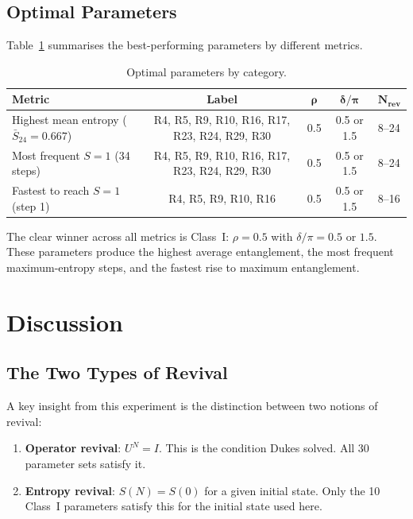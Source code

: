 \documentclass[12pt,a4paper]{article}
\begin{document}
\subsection{Optimal Parameters}

Table~\ref{tab:optimal} summarises the best-performing parameters by different metrics.

\begin{table}[H]
\centering
\caption{Optimal parameters by category.}
\label{tab:optimal}
\begin{tabular}{lcccl}
\toprule
\textbf{Metric} & \textbf{Label} & $\boldsymbol{\rho}$ & $\boldsymbol{\delta/\pi}$ & $\boldsymbol{N_{\text{rev}}}$ \\
\midrule
Highest mean entropy ($\bar{S}_{24} = 0.667$) & R4, R5, R9, R10, R16, R17, R23, R24, R29, R30 & 0.5 & 0.5 or 1.5 & 8--24 \\
Most frequent $S=1$ (34 steps) & R4, R5, R9, R10, R16, R17, R23, R24, R29, R30 & 0.5 & 0.5 or 1.5 & 8--24 \\
Fastest to reach $S=1$ (step 1) & R4, R5, R9, R10, R16 & 0.5 & 0.5 or 1.5 & 8--16 \\
\bottomrule
\end{tabular}
\end{table}

The clear winner across all metrics is Class~I: $\rho = 0.5$ with $\delta/\pi = 0.5$ or $1.5$. These parameters produce the highest average entanglement, the most frequent maximum-entropy steps, and the fastest rise to maximum entanglement.

\section{Discussion}

\subsection{The Two Types of Revival}

A key insight from this experiment is the distinction between two notions of revival:

\begin{enumerate}
    \item \textbf{Operator revival}: $U^N = I$. This is the condition Dukes solved. All 30 parameter sets satisfy it.
    \item \textbf{Entropy revival}: $S(N) = S(0)$ for a given initial state. Only the 10 Class~I parameters satisfy this for the initial state used here.
\end{enumerate}
\end{document}
